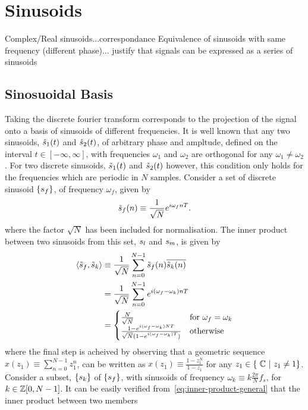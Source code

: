 \section{Sinusoids} Complex/Real sinusoids...correspondance Equivalence of
sinusoids with same frequency (different phase)... justify that signals can be
expressed as a series of sinusoids
\subsection{Sinosuoidal Basis} Taking the discrete fourier transform corresponds
to the projection of the signal onto a basis of sinusoids of different
frequencies. It is well known that any two sinusoids, $\hat{s}_1(t)$
and $\hat{s}_2(t)$, of arbitrary phase and ampltude, defined on the
interval $t \in [-\infty, \infty]$, with frequencies $\omega_1$ and $\omega_2$
are orthogonal for any $\omega_1 \neq \omega_2$. For two discrete sinusoids,
$\tilde{s}_1(t)$ and $\tilde{s}_2(t)$ however, this condition only holds
for the frequencies which are periodic in $N$ samples. Consider a set of
discrete sinusoid $\{ s_f\}$, of frequency $\omega_f$, given by
$$
\tilde{s}_f(n) \equiv \frac{1}{\sqrt{N}}e^{i\omega_f n T}.
$$
where the factor $\sqrt{N}$ has been included for normalisation. The inner
product between two sinusoids from this set, $s_l$ and $s_m$, is given by
\begin{align} \left< \tilde{s}_f, \tilde{s}_k \right> &\equiv \frac{1}{\sqrt{N}}
\sum_{n=0}^{N-1} \tilde{s}_f(n) \overline{\tilde{s}_k(n)} \\ &= \frac{1}{\sqrt{N}}
\sum_{n=0}^{N-1} e^{i ( \omega_f - \omega_k) nT} \\ &=
    \begin{cases} \frac{N}{\sqrt{N}} & \textrm{for}\ \omega_f = \omega_k \\
\frac{ 1 - e^{i ( \omega_f - \omega_k) NT} }{ \sqrt{N} ( 1 - e^{i ( \omega_f -
\omega_k) T} ) } & \textrm{otherwise}
    \end{cases}
\label{eq:inner-product-general}
\end{align} where the final step is acheived by observing that a geometric
sequence $x(z_1) \equiv \sum_{n=0}^{N - 1} z_1^n$, can be written as $x(z_1)
\equiv \frac{1-z_1^N}{1-z_1}$ for any $z_1 \in \{\ \mathbb{C}\ |\ z_1 \ne 1
\}$. Consider a subset, $\{ s_k \}$ of $\{ s_f \}$, with sinusoids of
frequency $\omega_k \equiv k \frac{2 \pi }{N} f_s$, for $k \in
\mathbb{Z}[0,N-1]$. It can be easily verified
from~\eqref{eq:inner-product-general} that the inner product between two members
